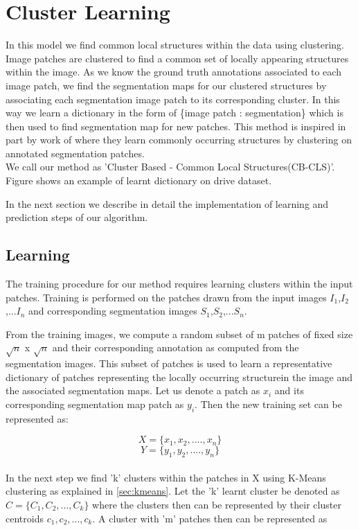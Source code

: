 
\section{Cluster Learning}
In this model we find common local structures within the data using clustering. Image patches are clustered to find a common set of locally appearing structures within the image. As we know the ground truth annotations associated to each image patch, we find the segmentation maps for our clustered structures by associating each segmentation image patch to its corresponding cluster. In this way we learn a dictionary in the form of \{image patch : segmentation\} which is then used to find segmentation map for new patches. This method is inspired in part by work of \citep{lim2013sketch} where they learn commonly occurring structures by clustering on annotated segmentation patches.\\
We call our method as 'Cluster Based - Common Local Structures(CB-CLS)'. Figure shows an example of learnt dictionary on drive dataset.

In the next section we describe in detail the implementation of learning and prediction steps of our algorithm.

\subsection{Learning}

The training procedure for our method requires learning clusters within the input patches. Training is performed on the patches drawn from the input images $I_1$,$I_2$,...$I_n$ and corresponding segmentation images $S_1$,$S_2$,...$S_n$. 

From the training images, we compute a random subset of m patches of fixed size $\sqrt{n}$ x $\sqrt{n}$ and their corresponding annotation as computed from the segmentation images. This subset of patches is used to learn a representative dictionary of patches representing the locally occurring structurein the image and the associated segmentation maps. Let us denote a patch as $x_i$ and its corresponding segmentation map patch as $y_i$. Then the new training set can be represented as:

$$
X = \{x_1,x_2,....,x_n\}
$$
$$
Y = \{y_1,y_2,....,y_n\}
$$
\\
In the next step we find 'k' clusters within the patches in X using K-Means clustering as explained in \ref{sec:kmeans}. Let the 'k' learnt cluster be denoted as $C = \{C_1,C_2,...,C_k\} $ where the clusters then can be represented by their cluster centroids $c_1, c_2,..., c_k$. A cluster with 'm' patches then can be represented as

